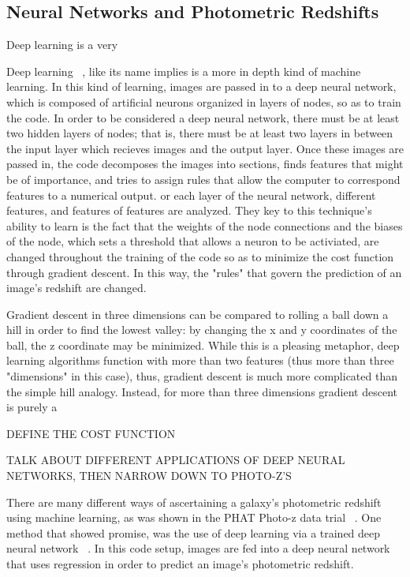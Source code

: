 \documentclass[fleqn,usenatbib]{mnras}
\begin{document}
\subsection{Neural Networks and Photometric Redshifts}
  \label{sec:nn_and_photoz}

Deep learning is a very

Deep learning ~\citep{lecun_deep_2015}, like its name implies is a more in depth kind of machine learning.  In this kind of learning, images are passed in to a deep neural network, which is composed of artificial neurons organized in layers of nodes, so as to train the code.  In order to be considered a deep neural network, there must be at least two hidden layers of nodes; that is, there must be at least two layers in between the input layer which recieves images and the output layer.  Once these images are passed in, the code decomposes the images into sections, finds features that might be of importance, and tries to assign rules that allow the computer to correspond features to a numerical output. or each layer of the neural network, different features, and features of features are analyzed.  They key to this technique's ability to learn is the fact that the weights of the node connections and the biases of the node, which sets a threshold that allows a neuron to be activiated, are changed throughout the training of the code so as to minimize the cost function through gradient descent.  In this way, the "rules" that govern the prediction of an image's redshift are changed.

Gradient descent in three dimensions can be compared to rolling a ball down a hill in order to find the lowest valley: by changing the x and y coordinates of the ball, the z coordinate may be minimized. While this is a pleasing metaphor, deep learning algorithms function with more than two features (thus more than three "dimensions" in this case), thus, gradient descent is much more complicated than the simple hill analogy.  Instead, for more than three dimensions gradient descent is purely a 

DEFINE THE COST FUNCTION 

TALK ABOUT DIFFERENT APPLICATIONS OF DEEP NEURAL NETWORKS, THEN NARROW DOWN TO PHOTO-Z'S

There are many different ways of ascertaining a galaxy's photometric redshift using machine learning, as was shown in the PHAT Photo-z data trial ~\citep{hildebrandt_phat:_2010}. One method that showed promise, was the use of deep learning via a trained deep neural network ~\citep{collister_annz:_2004}. In this code setup, images are fed into a deep neural network that uses regression in order to predict an image's photometric redshift.  
\end{document}
